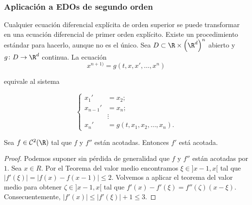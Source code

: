 \documentclass{article}
\begin{document}
\subsubsection{Aplicación a EDOs de segundo orden}

Cualquier ecuación diferencial explícita de orden superior se puede transformar en una ecuación
diferencial de primer orden explícito. Existe un procedimiento estándar para hacerlo, aunque no es
el único. Sea $D \subset \R \times \left(\R^d\right)^n$ abierto y $g \colon D \to \R^d$ continua. La
ecuación
\begin{equation}
  \label{eq:ed:sup}
  x^{n+1)} = g(t, x, x', \ldots, x^n)
\end{equation}

equivale al sistema

\begin{equation}
  \label{eq:ed:sup:sis}
  \begin{cases}
    x_1' & = x_2; \\
    x_{n-1}' & = x_n; \\
    & \vdots \\
    x_n' & = g(t, x_1, x_2, \ldots, x_n).
  \end{cases}
\end{equation}

\begin{lem} \label{lem:2-cota} Sea $f \in \mathcal{C}^2(\R)$ tal que $f$ y $f''$ están
  acotadas. Entonces $f'$ está acotada.
\end{lem}
\begin{proof}
  Podemos suponer sin pérdida de generalidad que $f$ y $f''$ están acotadas por $1$. Sea $x \in
  R$. Por el Teorema del valor medio encontramos $\xi \in ]x-1,x[$ tal que
  $|f'(\xi)| = |f(x) - f(x-1)| \le 2$. Volvemos a aplicar el teorema del valor medio para obtener
  $\zeta \in ]x-1,x[$ tal que $f'(x)-f'(\xi) = f''(\zeta)(x-\xi)$. Consecuentemente,
  $|f'(x)| \le |f'(\xi)| + 1 \le 3$.
\end{proof}
\end{document}
